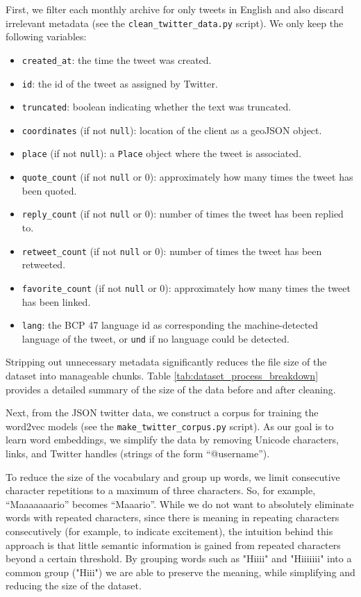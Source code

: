 \documentclass{paper}
\begin{document}
First, we filter each monthly archive for only tweets in English and also discard irrelevant metadata (see the \texttt{clean\_twitter\_data.py} script). We only keep the following variables:
\begin{itemize}
    \item \texttt{created\_at}: the time the tweet was created.
    \item \texttt{id}: the id of the tweet as assigned by Twitter.
    \item \texttt{truncated}: boolean indicating whether the text was truncated.
    \item \texttt{coordinates} (if not \texttt{null}): location of the client as a geoJSON object.
    \item \texttt{place} (if not \texttt{null}): a \texttt{Place} object where the tweet is associated.
    \item \texttt{quote\_count} (if not \texttt{null} or $0$): approximately how many times the tweet has been quoted.
    \item \texttt{reply\_count} (if not \texttt{null} or $0$): number of times the tweet has been replied to.
    \item \texttt{retweet\_count} (if not \texttt{null} or $0$): number of times the tweet has been retweeted.
    \item \texttt{favorite\_count} (if not \texttt{null} or $0$): approximately how many times the tweet has been linked.
    \item \texttt{lang}: the BCP 47 language id as corresponding the machine-detected language of the tweet, or \texttt{und} if no language could be detected.
\end{itemize}

Stripping out unnecessary metadata significantly reduces the file size of the dataset into manageable chunks. Table \ref{tab:dataset_process_breakdown} provides a detailed summary of the size of the data before and after cleaning.

Next, from the JSON twitter data, we construct a corpus for training the word2vec models (see the \texttt{make\_twitter\_corpus.py} script). As our goal is to learn word embeddings, we simplify the data by removing Unicode characters, links, and Twitter handles (strings of the form ``@username'').

To reduce the size of the vocabulary and group up words, we limit consecutive character repetitions to a maximum of three characters. So, for example, ``Maaaaaaario'' becomes ``Maaario''. While we do not want to absolutely eliminate words with repeated characters, since there is meaning in repeating characters consecutively (for example, to indicate excitement), the intuition behind this approach is that little semantic information is gained from repeated characters beyond a certain threshold. By grouping words such as "Hiiii" and "Hiiiiiii" into a common group ("Hiii") we are able to preserve the meaning, while simplifying and reducing the size of the dataset.
\end{document}
